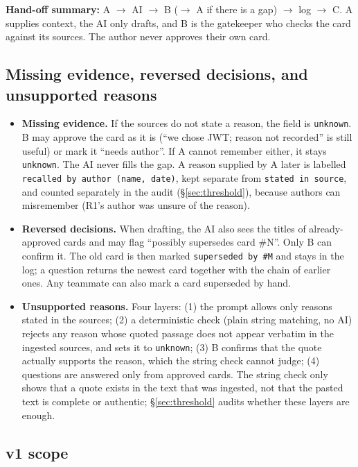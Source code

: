 \documentclass[11pt,a4paper]{article}
\newcommand{\code}[1]{\texttt{#1}}
\newcommand{\ra}{$\rightarrow$}
\begin{document}
\textbf{Hand-off summary:} A \ra{} AI \ra{} B (\ra{} A if there is a gap) \ra{} log \ra{} C. A supplies context, the AI only drafts, and B is the gatekeeper who checks the card against its sources. The author never approves their own card.

\subsection{Missing evidence, reversed decisions, and unsupported reasons}

\begin{itemize}
  \item \textbf{Missing evidence.} If the sources do not state a reason, the field is \code{unknown}. B may approve the card as it is (``we chose JWT; reason not recorded'' is still useful) or mark it ``needs author''. If A cannot remember either, it stays \code{unknown}. The AI never fills the gap. A reason supplied by A later is labelled \code{recalled by author (name, date)}, kept separate from \code{stated in source}, and counted separately in the audit (\S\ref{sec:threshold}), because authors can misremember (R1's author was unsure of the reason).
  \item \textbf{Reversed decisions.} When drafting, the AI also sees the titles of already-approved cards and may flag ``possibly supersedes card \#N''. Only B can confirm it. The old card is then marked \code{superseded by \#M} and stays in the log; a question returns the newest card together with the chain of earlier ones. Any teammate can also mark a card superseded by hand.
  \item \textbf{Unsupported reasons.} Four layers: (1) the prompt allows only reasons stated in the sources; (2) a deterministic check (plain string matching, no AI) rejects any reason whose quoted passage does not appear verbatim in the ingested sources, and sets it to \code{unknown}; (3) B confirms that the quote actually supports the reason, which the string check cannot judge; (4) questions are answered only from approved cards. The string check only shows that a quote exists in the text that was ingested, not that the pasted text is complete or authentic; \S\ref{sec:threshold} audits whether these layers are enough.
\end{itemize}

\subsection{v1 scope}\label{sec:scope}
\end{document}
